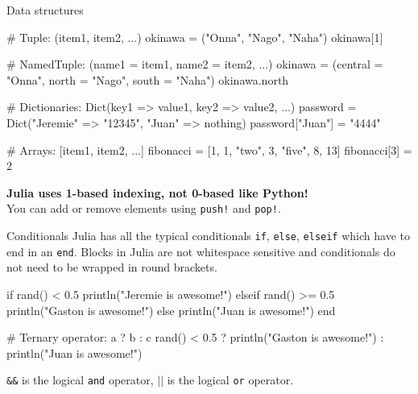 \documentclass{beamer}
\newenvironment{Boxx}{\begin{tcolorbox}[standard jigsaw, opacityframe=0.8, opacityback=0.0]}{\end{tcolorbox}}
\begin{document}
\begin{frame}[fragile]{Data structures}
	\begin{Boxx}
	\begin{jllisting}
  # Tuple: (item1, item2, ...)
  okinawa = ("Onna", "Nago", "Naha")
  okinawa[1] 
		
  # NamedTuple: (name1 = item1, name2 = item2, ...)
  okinawa = (central = "Onna", north = "Nago", south = "Naha")
  okinawa.north 
		
  # Dictionaries: Dict(key1 => value1, key2 => value2, ...)
  password = Dict("Jeremie" => "12345", "Juan" => nothing)
  password["Juan"] = "4444"
		
  # Arrays: [item1, item2, ...]
  fibonacci = [1, 1, "two", 3, "five", 8, 13]
  fibonacci[3] = 2
	\end{jllisting}
\end{Boxx}

\textbf{Julia uses 1-based indexing, not 0-based like Python!}\\
You can add or remove elements using \verb|push!| and \verb|pop!|.
\end{frame}


\begin{frame}[fragile]{Conditionals}
  Julia has all the typical conditionals \verb|if|, \verb|else|, \verb|elseif| which have to end in an \verb|end|.
  Blocks in Julia are not whitespace sensitive and conditionals do not need to be wrapped in round brackets.
  \begin{Boxx}
  \begin{jllisting}
  if rand() < 0.5
    println("Jeremie is awesome!")
  elseif rand() >= 0.5
    println("Gaston is awesome!")
  else
    println("Juan is awesome!")
  end
  
  # Ternary operator: a ? b : c
  rand() < 0.5 ? println("Gaston  is awesome!") : println("Juan  is awesome!")
\end{jllisting}
\end{Boxx}

\verb|&&| is the logical \verb|and| operator, $||$ is the logical \verb|or| operator.
\end{frame}
\end{document}
